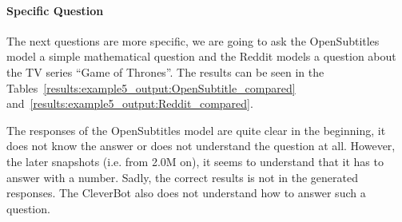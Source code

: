 \paragraph{Specific Question}
The next questions are more specific, we are going to ask the OpenSubtitles model a simple mathematical question and the Reddit models a question about the TV series ``Game of Thrones''. The results can be seen in the Tables~\ref{results:example5_output:OpenSubtitle_compared} and~\ref{results:example5_output:Reddit_compared}.

The responses of the OpenSubtitles model are quite clear in the beginning, it does not know the answer or does not understand the question at all. However, the later snapshots (i.e. from 2.0M on), it seems to understand that it has to answer with a number. Sadly, the correct results is not in the generated responses. The CleverBot also does not understand how to answer such a question.

